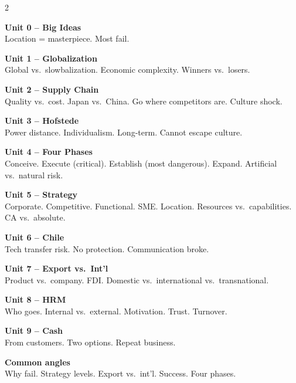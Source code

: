 \documentclass[8pt,landscape,a4paper]{article}
\begin{document}
\newpage
\vspace*{0.3em}
\noindent\color{noteblue}
\setlength{\parskip}{0.3em}
\begin{multicols}{2}

\textbf{Unit 0 -- Big Ideas}\\
Location = masterpiece. Most fail.

\textbf{Unit 1 -- Globalization}\\
Global vs.\ slowbalization. Economic complexity. Winners vs.\ losers.

\textbf{Unit 2 -- Supply Chain}\\
Quality vs.\ cost. Japan vs.\ China. Go where competitors are. Culture shock.

\textbf{Unit 3 -- Hofstede}\\
Power distance. Individualism. Long-term. Cannot escape culture.

\textbf{Unit 4 -- Four Phases}\\
Conceive. Execute (critical). Establish (most dangerous). Expand. Artificial vs.\ natural risk.

\textbf{Unit 5 -- Strategy}\\
Corporate. Competitive. Functional. SME. Location. Resources vs.\ capabilities. CA vs.\ absolute.

\textbf{Unit 6 -- Chile}\\
Tech transfer risk. No protection. Communication broke.

\textbf{Unit 7 -- Export vs.\ Int'l}\\
Product vs.\ company. FDI. Domestic vs.\ international vs.\ transnational.

\textbf{Unit 8 -- HRM}\\
Who goes. Internal vs.\ external. Motivation. Trust. Turnover.

\textbf{Unit 9 -- Cash}\\
From customers. Two options. Repeat business.

\textbf{Common angles}\\
Why fail. Strategy levels. Export vs.\ int'l. Success. Four phases.

\end{multicols}
\vfill
\normalsize\normalfont\color{black}
\end{document}
